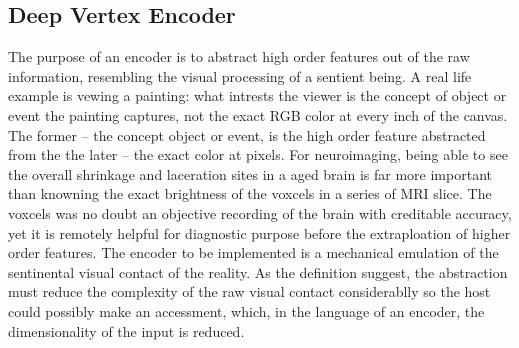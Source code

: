 \documentclass[twocolumn]{article}
\begin{document}
\subsection{Deep Vertex Encoder}
The purpose of an encoder is to abstract high order features out of the raw information, resembling the visual processing of a sentient being. A real life example is vewing a painting: what intrests the viewer is the concept of object or event the painting captures, not the exact RGB color at every inch of the canvas. The former -- the concept object or event, is the high order feature abstracted from the the later -- the exact color at pixels. For neuroimaging, being able to see the overall shrinkage and laceration sites in a aged brain is far more important than knowning the exact brightness of the voxcels in a series of MRI slice. The voxcels was no doubt an objective recording of the brain with creditable accuracy, yet it is remotely helpful for diagnostic purpose before the extraploation of higher order features. The encoder to be implemented is a mechanical emulation of the sentinental visual contact of the reality. As the definition suggest, the abstraction must reduce the complexity of the raw visual contact considerablly so the host could possibly make an accessment, which, in the language of an encoder, the dimensionality of the input is reduced.  
\end{document}
